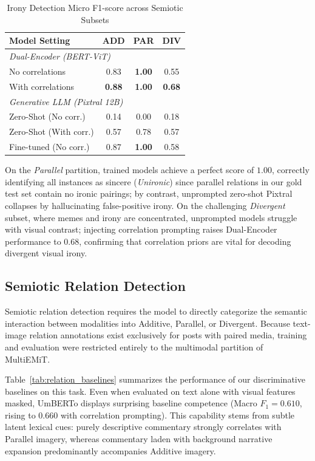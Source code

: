 \begin{table}[!t]
\centering
\caption{Irony Detection Micro F1-score across Semiotic Subsets}
\label{tab:subset_irony}
\small
\begin{tabular}{l c c c}
\hline
\textbf{Model Setting} & \textbf{ADD} & \textbf{PAR} & \textbf{DIV} \\
\hline
\multicolumn{4}{l}{\textit{Dual-Encoder (BERT-ViT)}} \\
No correlations & 0.83 & \textbf{1.00} & 0.55 \\
With correlations & \textbf{0.88} & \textbf{1.00} & \textbf{0.68} \\
\hline
\multicolumn{4}{l}{\textit{Generative LLM (Pixtral 12B)}} \\
Zero-Shot (No corr.) & 0.14 & 0.00 & 0.18 \\
Zero-Shot (With corr.) & 0.57 & 0.78 & 0.57 \\
Fine-tuned (No corr.) & 0.87 & \textbf{1.00} & 0.58 \\
\hline
\end{tabular}
\end{table}

On the \textit{Parallel} partition, trained models achieve a perfect score of $1.00$, correctly identifying all instances as sincere (\textit{Unironic}) since parallel relations in our gold test set contain no ironic pairings; by contrast, unprompted zero-shot Pixtral collapses by hallucinating false-positive irony. On the challenging \textit{Divergent} subset, where memes and irony are concentrated, unprompted models struggle with visual contrast; injecting correlation prompting raises Dual-Encoder performance to $0.68$, confirming that correlation priors are vital for decoding divergent visual irony.

\subsection{Semiotic Relation Detection}
\label{sec:relation_results}

Semiotic relation detection requires the model to directly categorize the semantic interaction between modalities into Additive, Parallel, or Divergent. Because text-image relation annotations exist exclusively for posts with paired media, training and evaluation were restricted entirely to the multimodal partition of MultiEMiT.

Table~\ref{tab:relation_baselines} summarizes the performance of our discriminative baselines on this task. Even when evaluated on text alone with visual features masked, UmBERTo displays surprising baseline competence (Macro $F_1 = 0.610$, rising to $0.660$ with correlation prompting). This capability stems from subtle latent lexical cues: purely descriptive commentary strongly correlates with Parallel imagery, whereas commentary laden with background narrative expansion predominantly accompanies Additive imagery.

